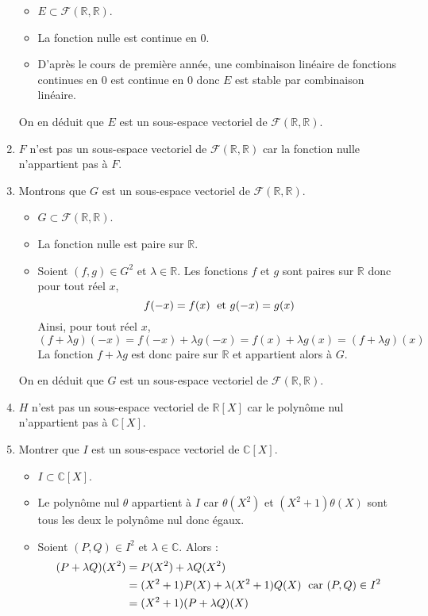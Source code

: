 \documentclass[a4paper,twoside,french,10pt]{VcCours}
\begin{document}
\begin{enumerate}
\begin{itemize}
\item $E \subset \mathcal{F}(\mathbb{R}, \mathbb{R})$.
\item La fonction nulle est continue en $0$.
\item D'après le cours de première année, une combinaison linéaire de fonctions continues en $0$ est continue en $0$ donc $E$ est stable par combinaison linéaire.
\end{itemize}
On en déduit que $E$ est un sous-espace vectoriel de $\mathcal{F}(\mathbb{R}, \mathbb{R})$.
\item $F$ n'est pas un sous-espace vectoriel de $\mathcal{F}(\mathbb{R}, \mathbb{R})$ car la fonction nulle n'appartient pas à $F$.
\item Montrons que $G$ est un sous-espace vectoriel de $\mathcal{F}(\mathbb{R}, \mathbb{R})$.
\begin{itemize}
\item $G \subset \mathcal{F}(\mathbb{R}, \mathbb{R})$.
\item La fonction nulle est paire sur $\mathbb{R}$.
\item Soient $(f,g) \in G^2$ et $\lambda \in \mathbb{R}$. Les fonctions $f$ et $g$ sont paires sur $\mathbb{R}$ donc pour tout réel $x$,
$$ f(-x) = f(x) \; \hbox{ et } g(-x)=g(x)$$
Ainsi, pour tout réel $x$,
$$ (f+ \lambda g)(-x) = f(-x) + \lambda g(-x)= f(x) + \lambda g(x) = (f+ \lambda g)(x)$$
La fonction $f + \lambda g$ est donc paire sur $\mathbb{R}$ et appartient alors à $G$.
\end{itemize}
On en déduit que $G$ est un sous-espace vectoriel de $\mathcal{F}(\mathbb{R}, \mathbb{R})$.
\item $H$ n'est pas un sous-espace vectoriel de $\mathbb{R}[X]$ car le polynôme nul n'appartient pas à $\mathbb{C}[X]$.
\item Montrer que $I$ est un sous-espace vectoriel de $\mathbb{C}[X]$.
\begin{itemize}
\item $I \subset \mathbb{C}[X]$.
\item Le polynôme nul $\theta$ appartient à $I$ car $\theta(X^2)$ et $(X^2+1) \theta(X)$ sont tous les deux le polynôme nul donc égaux. 
\item Soient $(P,Q) \in I^2$ et $\lambda \in \mathbb{C}$. Alors :
\begin{align*}
(P + \lambda Q)(X^2)  & = P(X^2) + \lambda Q(X^2) \\
& = (X^2+1) P(X) + \lambda (X^2+1) Q(X) \; \hbox{ car } (P,Q) \in I^2 \\
& = (X^2+1)(P+\lambda Q)(X)

\end{align*}
\end{itemize}
\end{enumerate}
\end{document}

